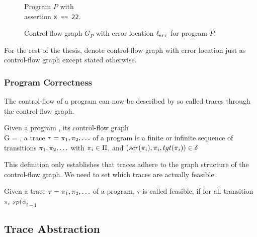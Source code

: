 \begin{center}
	\begin{minipage}[b]{0.4\linewidth}
		\begin{figure}[H]
			\centering
			
			\caption{Program $P$ with \\ assertion \texttt{x == 22}.}
			\label{codeWithAss}
		\end{figure}
	\end{minipage}
	\hfill
	\begin{minipage}[b]{0.59\linewidth}
		\begin{figure}[H]
			\centering
			
			\caption{Control-flow graph $G_P$ with error location $\ell_{err}$ for program $P$.}
			\label{cfg:P:Ass}
		\end{figure}
	\end{minipage}
\end{center}
For the rest of the thesis, denote control-flow graph with error location just as control-flow graph except stated otherwise.
\subsubsection{Program Correctness}
The control-flow of a program can now be described by so called traces through the control-flow graph.
\begin{mydef}
	Given a program	\prg, its control-flow graph \\ G = \cfg, a trace $\tau = \pi_1, \pi_2, \ldots $ of a program is a finite or infinite sequence of transitions $\pi_1, \pi_2, \ldots$ with $\pi_i \in \Pi$, and $(scr(\pi_i), \pi_i, tgt(\pi_i)) \in \delta$
\end{mydef}
This definition only establishes that traces adhere to the graph structure of the control-flow graph. We need to set which traces are actually feasible.
\begin{mydef}
	Given a trace $\tau = \pi_1, \pi_2, \ldots $ of a program, $\tau$ is called feasible, if for all transition $\pi_i$ $sp(\phi_{i-1}$
\end{mydef}





\subsection{Trace Abstraction}